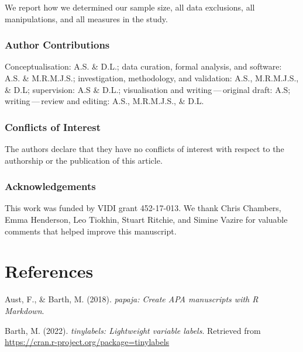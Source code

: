 \documentclass[british,,man,floatsintext]{apa6}
\begin{document}
We report how we determined our sample size, all data exclusions, all manipulations, and all measures in the study.

\hypertarget{author-contributions}{%
\subsubsection{Author Contributions}\label{author-contributions}}

Conceptualisation: A.S. \& D.L.; data curation, formal analysis, and software: A.S. \& M.R.M.J.S.; investigation, methodology, and validation: A.S., M.R.M.J.S., \& D.L; supervision: A.S \& D.L.; visualisation and writing\(\,\)---\(\,\)original draft: A.S; writing\(\,\)---\(\,\)review and editing: A.S., M.R.M.J.S., \& D.L.

\hypertarget{conflicts-of-interest}{%
\subsubsection{Conflicts of Interest}\label{conflicts-of-interest}}

The authors declare that they have no conflicts of interest with respect to the authorship or the publication of this article.

\hypertarget{acknowledgements}{%
\subsubsection{Acknowledgements}\label{acknowledgements}}

This work was funded by VIDI grant 452-17-013. We thank Chris Chambers, Emma Henderson, Leo Tiokhin, Stuart Ritchie, and Simine Vazire for valuable comments that helped improve this manuscript.

\hypertarget{references}{%
\section{References}\label{references}}

\setlength{\parindent}{-0.2in}
\setlength{\leftskip}{0.2in}

\hypertarget{refs}{}
\leavevmode\hypertarget{ref-R-papaja}{}%
Aust, F., \& Barth, M. (2018). \emph{papaja: Create APA manuscripts with R Markdown}.

\leavevmode\hypertarget{ref-R-tinylabels}{}%
Barth, M. (2022). \emph{tinylabels: Lightweight variable labels}. Retrieved from \url{https://cran.r-project.org/package=tinylabels}
\end{document}
